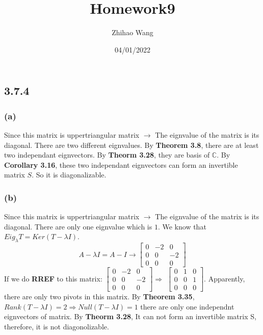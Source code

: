 \documentclass{article}
\title{Homework9}
\author{Zhihao Wang}
\date{04/01/2022}
\begin{document}
\maketitle 

\subsection*{3.7.4}
\subsubsection*{(a)}
Since this matrix is uppertriangular matrix $\rightarrow$ The eignvalue of the matrix is its diagonal.
There are two different eignvalues. By \textbf{Theorem 3.8}, there are at least two independant eignvectors. By \textbf{Theorm 3.28}, 
they are basis of $\mathbb{C}$. By \textbf{Corollary 3.16}, these two independant eignvectors can form an invertible matrix $S$. 
So it is diagonalizable.

\subsubsection*{(b)}
Since this matrix is uppertriangular matrix $\rightarrow$ The eignvalue of the matrix is its diagonal. There are only one eignvalue which is $1$.
We know that $Eig _\lambda T = Ker(T - \lambda I)$.
\begin{equation*}
    A - \lambda I = A - I \rightarrow
    \begin {bmatrix}
    0 & -2 & 0\\
    0 & 0 & -2\\
    0 & 0 & 0
    \end {bmatrix} 
\end{equation*}
If we do \textbf{RREF} to this matrix:
${\begin {bmatrix}
0 & -2 & 0\\
0 & 0 & -2\\
0 & 0 & 0
\end {bmatrix}} \Rightarrow$ 
${\begin {bmatrix}
0 & 1 & 0\\
0 & 0 & 1\\
0 & 0 & 0
\end {bmatrix}}$.
Apparently, there are only two pivots in this matrix. By \textbf{Theorem 3.35}, $Rank(T - \lambda I) = 2 \Rightarrow Null(T - \lambda I) = 1$ there are only one independnt eignvectors of
matrix. By \textbf{Theorm 3.28}, It can not form an invertible matrix S, therefore, it is not diagonolizable.
\end{document}
